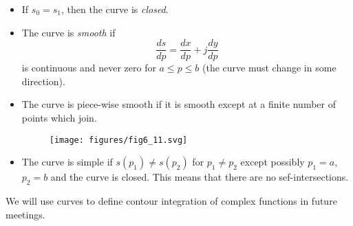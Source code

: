 \documentclass{article}
\begin{document}
\begin{itemize}
\item If $s_0 = s_1$, then the curve is \textit{closed}.
\item The curve is \textit{smooth} if
  \[
  \frac{ds}{dp} = \frac{dx}{dp} + j \frac{dy}{dp} 
  \]
  is continuous and never zero for $a \leq p \leq b$ (the curve must change in some direction).
\item The curve is piece-wise smooth if it is smooth except at a finite number of points which join.
  
\begin{figure}
  \centering
  \texttt{[image: figures/fig6\_11.svg]}
\end{figure}

\item The curve is simple if $s(p_1) \neq s(p_2)$ for $p_1 \neq p_2$ except possibly $p_1=a$, $p_2 = b$ and the curve is closed. This means that there are no sef-intersections. 
\end{itemize}

We will use curves to define contour integration of complex functions in future meetings.
\end{document}
